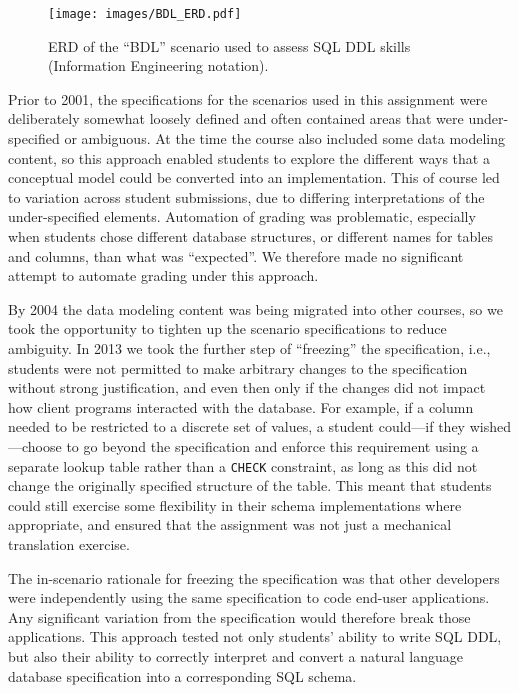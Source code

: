 \documentclass[sigconf, authordraft, capitalise]{acmart}
\begin{document}
 
\begin{figure}[hb]
    \centering
    \texttt{[image: images/BDL\_ERD.pdf]} 
    \caption{ERD of the ``BDL'' scenario used to assess SQL DDL skills (Information Engineering notation).}
    \label{fig-ERD}
\end{figure}


Prior to 2001, the specifications for the scenarios used in this assignment were deliberately somewhat loosely defined and often contained areas that were under-specified or ambiguous. At the time the course also included some data modeling content, so this approach enabled students to explore the different ways that a conceptual model could be converted into an implementation. This of course led to variation across student submissions, due to differing interpretations of the under-specified elements. Automation of grading was problematic, especially when students chose different database structures, or different names for tables and columns, than what was ``expected''. We therefore made no significant attempt to automate grading under this approach.

By 2004 the data modeling content was being migrated into other courses, so we took the opportunity to tighten up the scenario specifications to reduce ambiguity. In 2013 we took the further step of ``freezing'' the specification, i.e., students were not permitted to make arbitrary changes to the specification without strong justification, and even then only if the changes did not impact how client programs interacted with the database. For example, if a column needed to be restricted to a discrete set of values, a student could---if they wished---choose to go beyond the specification and enforce this requirement using a separate lookup table rather than a \texttt{CHECK} constraint, as long as this did not change the originally specified structure of the table. This meant that students could still exercise some flexibility in their schema implementations where appropriate, and ensured that the assignment was not just a mechanical translation exercise.

The in-scenario rationale for freezing the specification was that other developers were independently using the same specification to code end-user applications. Any significant variation from the specification would therefore break those applications. This approach tested not only students' ability to write SQL DDL, but also their ability to correctly interpret and convert a natural language database specification into a corresponding SQL schema.
\end{document}
